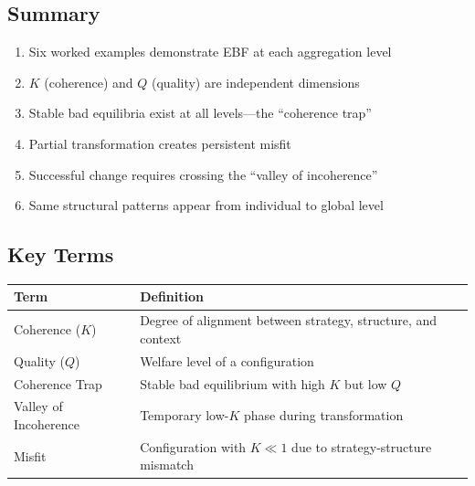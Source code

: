 
\subsection{Summary}

\begin{tcolorbox}[colback=gray!5!white, colframe=gray!75!black,
    title=\textbf{Summary: Appendix UNMAPPED_EXM Key Points}]

\begin{enumerate}
    \item Six worked examples demonstrate EBF at each aggregation level
    \item $K$ (coherence) and $Q$ (quality) are independent dimensions
    \item Stable bad equilibria exist at all levels—the ``coherence trap''
    \item Partial transformation creates persistent misfit
    \item Successful change requires crossing the ``valley of incoherence''
    \item Same structural patterns appear from individual to global level
\end{enumerate}

\end{tcolorbox}


\subsection{Key Terms}

\begin{tabular}{@{}p{3cm}p{9cm}@{}}
\textbf{Term} & \textbf{Definition} \\
\hline
Coherence ($K$) & Degree of alignment between strategy, structure, and context \\
Quality ($Q$) & Welfare level of a configuration \\
Coherence Trap & Stable bad equilibrium with high $K$ but low $Q$ \\
Valley of Incoherence & Temporary low-$K$ phase during transformation \\
Misfit & Configuration with $K \ll 1$ due to strategy-structure mismatch \\
\end{tabular}

